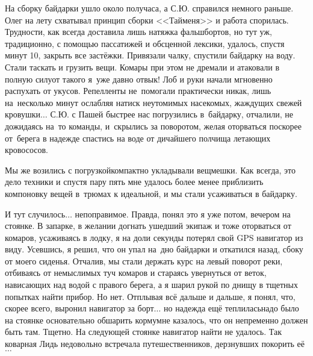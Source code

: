 На сборку байдарки ушло около получаса, а С.Ю. справился немного раньше. Олег на лету схватывал принцип сборки <<Тайменя>> и работа спорилась. Трудности, как всегда доставила лишь натяжка фальшбортов, но тут уж, традиционно, с помощью пассатижей и обсценной лексики, удалось, спустя минут 10, закрыть все застёжки. Привязали чалку, спустили байдарку на воду. Стали таскать и грузить вещи. Комары при этом не дремали и атаковали в полную силу\mdash от такого я~уже давно отвык! Лоб и руки начали мгновенно распухать от укусов. Репелленты не~помогали практически никак, лишь на~несколько минут ослабляя натиск неутомимых насекомых, жаждущих свежей кровушки$\ldots$ С.Ю. с Пашей быстрее нас погрузились в~байдарку, отчалили, не дожидаясь на~то команды, и~скрылись за поворотом, желая оторваться поскорее от~берега в надежде спастись на воде от дичайшего полчища летающих кровососов.

Мы же возились с погрузкой\mdash компактно укладывали вещмешки. Как всегда, это дело техники и спустя пару пять мне удалось более менее приблизить компоновку вещей в~трюмах к идеальной, и мы стали усаживаться в байдарку. 

И тут случилось$\ldots$ непоправимое. Правда, понял это я уже потом, вечером на стоянке. В запарке, в желании догнать ушедший экипаж и тоже оторваться от комаров, усаживаясь в лодку, я на доли секунды потерял свой GPS навигатор из виду. Усевшись, я решил, что он упал на~дно байдарки и откатился назад, сбоку от моего сиденья. Отчалив, мы стали держать курс на левый поворот реки, отбиваясь от немыслимых туч комаров и стараясь увернуться от веток, нависающих над водой с правого берега, а я шарил рукой по днищу в тщетных попытках найти прибор. Но нет. Отплывая всё дальше и дальше, я понял, что, скорее всего, выронил навигатор за борт$\ldots$ но надежда ещё теплилась\mdash надо было на стоянке основательно обшарить корму\mdash мне казалось, что он непременно должен быть там. Тщетно. На следующей стоянке навигатор найти не удалось. Так коварная Лидь недовольно встречала путешественников, дерзнувших покорить её$\ldots$

